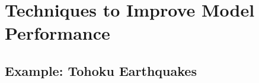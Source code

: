\section{Techniques to Improve Model Performance} %





\subsection{Example: Tohoku Earthquakes}





